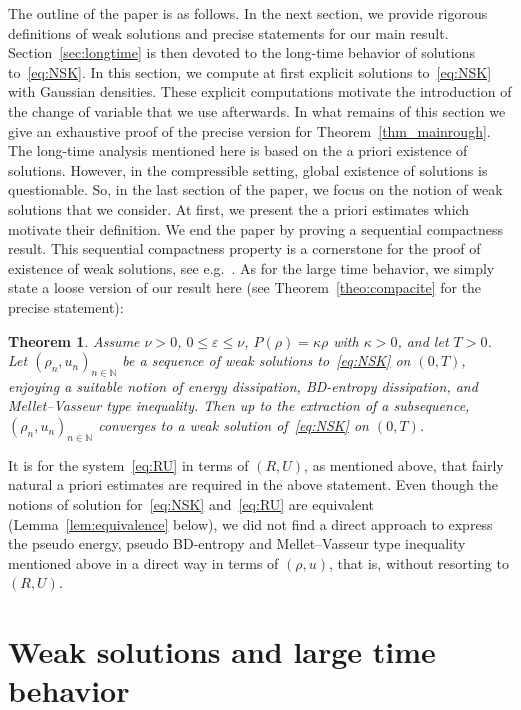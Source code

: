 \documentclass[11pt]{article}
\newtheorem{theo}{Theorem}[section]
\theoremstyle{definition}
\numberwithin{equation}{section}
\numberwithin{figure}{section}
\numberwithin{table}{section}
\newcommand*\N{\mathbb{N}}
\newcommand*\<{\left\langle}
\renewcommand*\>{\right\rangle}
\renewcommand*\le{\leqslant}
\newcommand*\eps{\varepsilon}
\begin{document}
The outline of the paper is as follows. In the next section, we provide rigorous definitions of weak solutions and precise statements for our main result. Section~\ref{sec:longtime} is then devoted to the long-time behavior of solutions to~\eqref{eq:NSK}. In this section, we compute at first explicit solutions to~\eqref{eq:NSK} with Gaussian densities. These explicit computations motivate the introduction of the change of variable that we use afterwards. In what remains of this section we give an exhaustive proof of the precise version for Theorem~\ref{thm_mainrough}. The long-time analysis mentioned here is based on the a priori existence of solutions. However, in the compressible setting, global existence of solutions is questionable. So, in the last section of the paper, we focus on the notion of weak solutions that we consider. At first, we present the a priori estimates which motivate their definition. We end the paper by proving a sequential compactness result. This sequential compactness property is a cornerstone for the proof of existence of weak solutions, see e.g.~\cite{Lio98,Fei04}. As for the large time behavior, we simply state a loose version of our result here (see Theorem~\ref{theo:compacite} for the precise statement):
\begin{theo}
Assume $\nu >0$, $0\le \eps \le \nu$, $P(\rho)=\kappa \rho$ with $\kappa>0$, and let $T>0$. Let $(\rho_n,u_n)_{n\in \N}$ be a sequence of weak solutions to~\eqref{eq:NSK} on $(0,T)$, enjoying a suitable notion of energy dissipation, BD-entropy dissipation, and Mellet--Vasseur type inequality. Then up to the extraction of a subsequence, $(\rho_n,u_n)_{n\in \N}$ converges to a weak solution of~\eqref{eq:NSK} on $(0,T)$.
\end{theo}

It is for the system~\eqref{eq:RU} in terms of $(R,U)$, as mentioned above, that fairly natural a priori estimates are required in the above statement. Even though the notions of solution for~\eqref{eq:NSK} and~\eqref{eq:RU} are equivalent (Lemma~\ref{lem:equivalence} below), we did not find a direct approach to express the pseudo energy, pseudo BD-entropy and Mellet--Vasseur type inequality mentioned above in a direct way in terms of $(\rho,u)$, that is, without resorting to $(R,U)$.



\section{Weak solutions and large time behavior}\label{sec:main}
\end{document}
